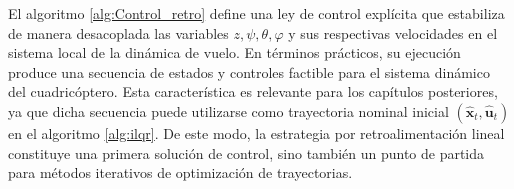 El algoritmo \ref{alg:Control_retro} define una ley de control explícita que estabiliza de manera desacoplada las variables $z, \psi, \theta, \varphi$ y sus respectivas velocidades en el sistema local de la dinámica de vuelo. En términos prácticos, su ejecución produce una secuencia de estados y controles factible para el sistema dinámico del cuadricóptero. Esta característica es relevante para los capítulos posteriores, ya que dicha secuencia puede utilizarse como trayectoria nominal inicial $(\hat{\mathbf{x}}_t,\hat{\mathbf{u}}_t)$ en el algoritmo \ref{alg:ilqr}. De este modo, la estrategia por retroalimentación lineal constituye una primera solución de control, sino también un punto de partida para métodos iterativos de optimización de trayectorias.
